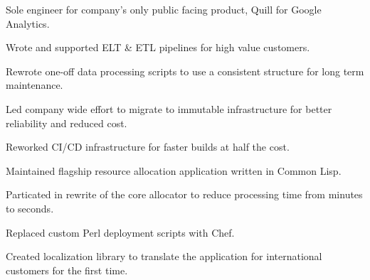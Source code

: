 \documentclass[]{deedy-resume-openfont}
\begin{document}
\sectionsep
{}
\vspace{\topsep}
\begin{tightemize}
\item Sole engineer for company's only public facing product, Quill for Google Analytics.
\item Wrote and supported ELT \& ETL pipelines for high value customers.
\item Rewrote one-off data processing scripts to use a consistent structure for long term maintenance.
\item Led company wide effort to migrate to immutable infrastructure for better reliability and reduced cost.
\item Reworked CI/CD infrastructure for faster builds at half the cost.
\end{tightemize}

\sectionsep
{}
\vspace{\topsep}
\begin{tightemize}
\item Maintained flagship resource allocation application written in Common Lisp.
\item Particated in rewrite of the core allocator to reduce processing time from minutes to seconds.
\item Replaced custom Perl deployment scripts with Chef.
\item Created localization library to translate the application for international customers for the first time.
\end{tightemize}
\end{document}

